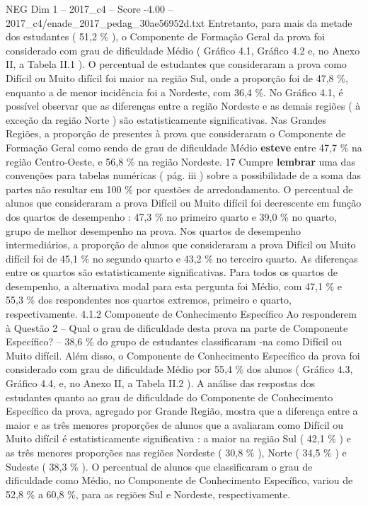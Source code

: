 \begin{textsample}{NEG Dim 1 – 2017\_c4 – Score -4.00 – 2017\_c4/enade\_2017\_pedag\_30ae56952d.txt}
Entretanto, para mais da metade dos estudantes ( 51,2 \% ), o Componente de Formação Geral da prova foi considerado com grau de dificuldade Médio ( Gráfico 4.1, Gráfico 4.2 e, no Anexo II, a Tabela II.1 ).
O percentual de estudantes que consideraram a prova como Difícil ou Muito difícil foi maior na região Sul, onde a proporção foi de 47,8 \%, enquanto a de menor incidência foi a Nordeste, com 36,4 \%.
No Gráfico 4.1, é possível observar que as diferenças entre a região Nordeste e as demais regiões ( à exceção da região Norte ) são estatisticamente significativas.
Nas Grandes Regiões, a proporção de presentes à prova que consideraram o Componente de Formação Geral como sendo de grau de dificuldade Médio \textbf{esteve} entre 47,7 \% na região Centro-Oeste, e 56,8 \% na região Nordeste. 17 Cumpre \textbf{lembrar} uma das convenções para tabelas numéricas ( pág. iii ) sobre a possibilidade de a soma das partes não resultar em 100 \% por questões de arredondamento.
O percentual de alunos que consideraram a prova Difícil ou Muito difícil foi decrescente em função dos quartos de desempenho : 47,3 \% no primeiro quarto e 39,0 \% no quarto, grupo de melhor desempenho na prova.
Nos quartos de desempenho intermediários, a proporção de alunos que consideraram a prova Difícil ou Muito difícil foi de 45,1 \% no segundo quarto e 43,2 \% no terceiro quarto.
As diferenças entre os quartos são estatisticamente significativas.
Para todos os quartos de desempenho, a alternativa modal para esta pergunta foi Médio, com 47,1 \% e 55,3 \% dos respondentes nos quartos extremos, primeiro e quarto, respectivamente. 4.1.2 Componente de Conhecimento Específico Ao responderem à Questão 2 – Qual o grau de dificuldade desta prova na parte de Componente Específico? – 38,6 \% do grupo de estudantes classificaram -na como Difícil ou Muito difícil.
Além disso, o Componente de Conhecimento Específico da prova foi considerado com grau de dificuldade Médio por 55,4 \% dos alunos ( Gráfico 4.3, Gráfico 4.4, e, no Anexo II, a Tabela II.2 ).
A análise das respostas dos estudantes quanto ao grau de dificuldade do Componente de Conhecimento Específico da prova, agregado por Grande Região, mostra que a diferença entre a maior e as três menores proporções de alunos que a avaliaram como Difícil ou Muito difícil é estatisticamente significativa : a maior na região Sul ( 42,1 \% ) e as três menores proporções nas regiões Nordeste ( 30,8 \% ), Norte ( 34,5 \% ) e Sudeste ( 38,3 \% ).
O percentual de alunos que classificaram o grau de dificuldade como Médio, no Componente de Conhecimento Específico, variou de 52,8 \% a 60,8 \%, para as regiões Sul e Nordeste, respectivamente.

\end{textsample}
